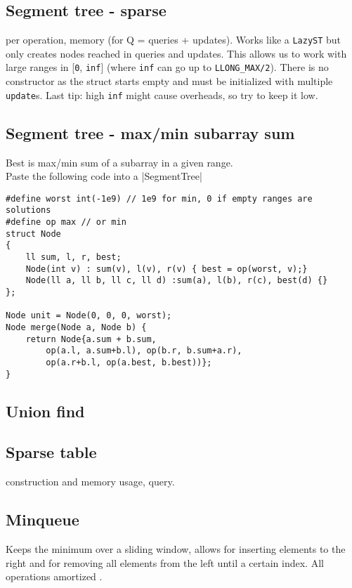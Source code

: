 \subsection{Segment tree - sparse}
 per operation,  memory (for Q = queries + updates).
Works like a \verb|LazyST| but only creates nodes reached in queries and updates.
This allows us to work with large ranges in [\verb|0|, \verb|inf|] (where \verb|inf| can go up to \verb|LLONG_MAX/2|).
There is no constructor as the struct starts empty and must be initialized with multiple \verb|update|s.
Last tip: high \verb|inf| might cause overheads, so try to keep it low.

\subsection{Segment tree - max/min subarray sum}
Best is max/min sum of a subarray in a given range. \\
Paste the following code into a |SegmentTree|
\begin{lstlisting}
#define worst int(-1e9) // 1e9 for min, 0 if empty ranges are solutions
#define op max // or min
struct Node 
{
	ll sum, l, r, best;
	Node(int v) : sum(v), l(v), r(v) { best = op(worst, v);}
	Node(ll a, ll b, ll c, ll d) :sum(a), l(b), r(c), best(d) {}
};

Node unit = Node(0, 0, 0, worst);
Node merge(Node a, Node b) {
	return Node{a.sum + b.sum, 
		op(a.l, a.sum+b.l), op(b.r, b.sum+a.r), 
		op(a.r+b.l, op(a.best, b.best))};
}

\end{lstlisting}
\subsection{Union find}

\subsection{Sparse table}
 construction and memory usage,  query.

\subsection{Minqueue}
Keeps the minimum over a sliding window, allows for inserting elements to the right and for removing all elements from the left until a certain index. All operations amortized .

